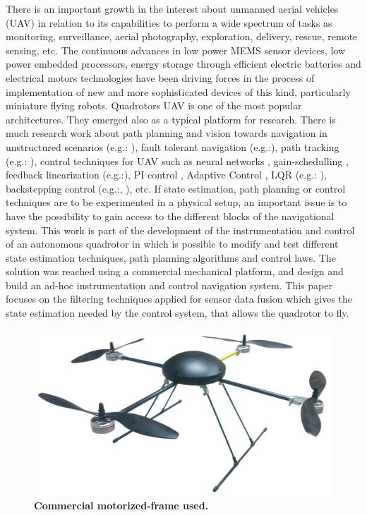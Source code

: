 \documentclass[conference]{IEEEtran}
\begin{document}
There is an important growth in the interest about unmanned aerial vehicles (UAV) in relation to its capabilities to perform a wide spectrum of tasks as monitoring, surveillance, aerial photography, exploration, delivery, rescue, remote sensing, etc.
The continuous advances in low power MEMS sensor devices, low power embedded processors, energy storage through efficient electric batteries and electrical motors technologies have been driving forces in the process of implementation of new and more sophisticated devices of this kind, particularly miniature flying robots. Quadrotors UAV is one of the most popular architectures.
They emerged also as a typical platform for research. There is much research work about path planning and vision towards navigation in unstructured scenarios (e.g.: \cite{bib:tio_cuatro, bib:tio_cinco, bib:tio_seis}), fault tolerant navigation (e.g.:\cite{bib:tio_tres}), path tracking (e.g.: \cite{bib:tio_ocho}), control techniques for UAV such as neural networks \cite{bib:tio_uno}, gain-schedulling \cite{bib:tio_tres}, feedback linearization (e.g.:\cite{bib:tio_seis, bib:tio_siete}), PI control \cite{bib:tio_ocho}, Adaptive Control \cite{bib:tio_dos}, LQR (e.g.: \cite{bib:tio_cinco, bib:lqrnotes}), backstepping control (e.g.:\cite{bib:tio_cuatro}, \cite{bib:tio_seis}), etc.
If state estimation, path planning or control techniques are to be experimented in a physical setup, an important issue is to have the possibility to gain access to the different blocks of the navigational system. 
This work is part of the development of the instrumentation and control of an autonomous quadrotor in which is possible to modify and test different state estimation techniques, path planning algorithms and control laws. The solution was reached using a commercial mechanical platform, and design and build an ad-hoc instrumentation and control navigation system.
This paper focuses on the filtering techniques applied for sensor data fusion which gives the state estimation needed by the control system, that allows the quadrotor to fly.
\begin{figure}
	\centering
	\includegraphics[width=.8\columnwidth]{./pics_paper/javi.png}
	\caption{\textbf{Commercial motorized-frame used.}}
	\label{fig:commercial_quadrotor}
\end{figure}
\end{document}

